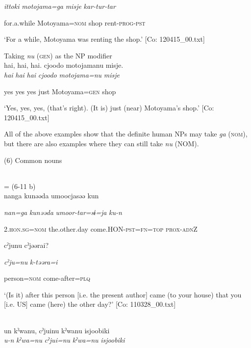       \textit{ittoki}  \textit{motojama=ga}  \textit{misje}  \textit{kar-tur-tar}

      for.a.while  Motoyama=\textsc{nom}  shop  rent-\textsc{prog}-\textsc{pst}

\glt ‘For a while, Motoyama was renting the shop.’ [Co: 120415\_00.txt]
\z

 \ex Taking \textit{nu} (\textsc{gen}) as the NP modifier\\
{\TM}
\gll  {\textbar}hai,  hai,  hai{\textbar}.  cjoodo  motojamanu  misje.\\

      \textit{hai}  \textit{hai}  \textit{hai}  \textit{cjoodo}  \textit{motojama=nu}  \textit{misje}

      yes  yes  yes  just  Motoyama=\textsc{gen}  shop

\glt ‘Yes, yes, yes, (that’s right). (It is) just (near) Motoyama’s shop.’ [Co: 120415\_00.txt]
\z

  All of the above examples show that the definite human NPs may take \textit{ga} (\textsc{nom}), but there are also examples where they can still take \textit{nu} (NOM).

(6)  Common nouns

 \ea{}\\
\gll = (6-11 b)\\

{\TM}
\gll nanga  kunəəda  umoocjasəə  kun

      \textit{nan=ga}  \textit{kunəəda}  \textit{umoor-tar=sɨ=ja}  \textit{ku-n}

      2.\textsc{hon}.\textsc{sg}=\textsc{nom}  the.other.day  come.HON-\textsc{pst}=\textsc{fn}=\textsc{top}  \textsc{prox}-\textsc{adn}Z

      cˀjunu  cˀjəərai?

      \textit{cˀju=nu}  \textit{k-təəra=i}

      person=\textsc{nom}  come-after=\textsc{plq}

\glt ‘(Is it) after this person [i.e. the present author] came (to your house) that you [i.e. US] came (here) the other day?’ [Co: 110328\_00.txt]
\z

 \ex{}\\
{\TM}
\gll  un  kˀwanu,  cˀjuinu  kˀwanu  isjoobiki\\

      \textit{u-n}  \textit{kˀwa=nu}  \textit{cˀjui=nu}  \textit{kˀwa=nu}  \textit{isjoobiki}

